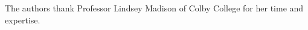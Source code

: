 \documentclass[journal=jacsat,manuscript=article]{achemso}
\begin{document}
%
\begin{acknowledgement}
The authors thank Professor Lindsey Madison of Colby College for her time and expertise.
\end{acknowledgement}
%
%
%
%
%

\end{document}
